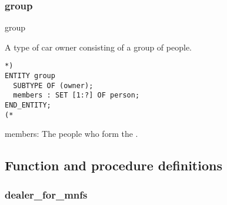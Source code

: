 \documentclass{article}
\begin{document}
\subsubsection{group}

\begin{Mnamedesc}{group}
\begin{Mdesctext}
    A type of car owner consisting of a group of people.
\end{Mdesctext}

\begin{Mexp}
\begin{verbatim}
*)
ENTITY group
  SUBTYPE OF (owner);
  members : SET [1:?] OF person;
END_ENTITY;
(*
\end{verbatim}
\end{Mexp}

\begin{Matts}

\item[members:] The people who form the .
\end{Matts}
\end{Mnamedesc}

\subsection{Function and procedure definitions}

\subsubsection{dealer\_for\_mnfs}
\end{document}
